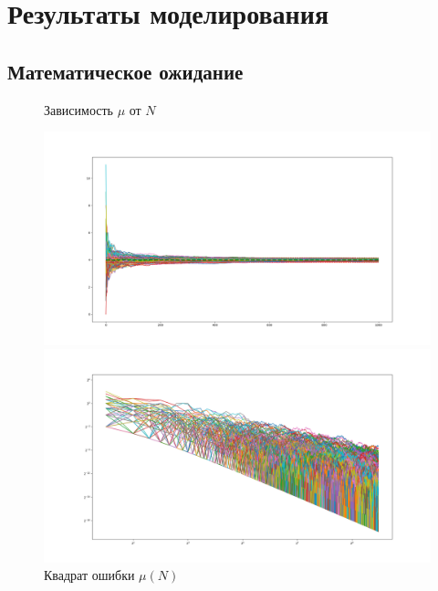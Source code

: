 \documentclass[a4paper,12pt,answers,noaddpoints]{exam}
\begin{document}
\pagebreak
\section{Результаты моделирования}
\subsection{Математическое ожидание}
\begin{figure}[h!]
\centering
\begin{minipage}[h!]{1.1\linewidth}
\caption{Зависимость $\mu$ от $N$}
\includegraphics[width=1\linewidth]{../pngs/means_N.png}
\end{minipage}
\vfill
\begin{minipage}[h!]{1.1\linewidth}
    \caption{Квадрат ошибки $\mu(N)$}
\includegraphics[width=1\linewidth]{../pngs/means_err.png}
\end{minipage}
\end{figure}
\pagebreak
\end{document}
